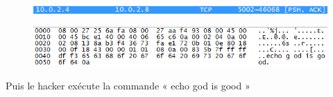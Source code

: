\documentclass[11pt]{article}
\begin{document}
\begin{figure}[hbtp]
        \centering \includegraphics[scale=0.4]{Exo3/19.png}
        \caption{}
         \label{fig:19}
\end{figure}

\begin{figure}[hbtp]
        \centering \includegraphics[scale=0.4]{Exo3/20.png}
        \caption{}
         \label{fig:20}
\end{figure}

Puis le hacker exécute la commande « echo god is good » 
\end{document}
